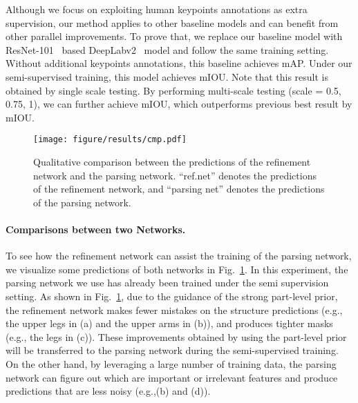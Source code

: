 \documentclass[10pt,twocolumn,letterpaper]{article}
\begin{document}
Although we focus on exploiting human keypoints annotations as extra supervision, our method applies to other baseline models and can benefit from other parallel improvements. To prove that, we replace our baseline model with ResNet-101~\cite{he2016deep} based DeepLabv2~\cite{chen2015deeplab} model and follow the same training setting. Without additional keypoints annotations, this baseline achieves  mAP. Under our semi-supervised training, this model achieves  mIOU. Note that this result is obtained by single scale testing. By performing multi-scale testing (scale = {0.5, 0.75, 1}), we can further achieve  mIOU, which outperforms previous best result by  mIOU.

\begin{figure}[t]
\begin{center}
\texttt{[image: figure/results/cmp.pdf]}
\end{center}
\vspace{-4mm}
   \caption{Qualitative comparison between the predictions of the refinement network and the parsing network. ``ref.net'' denotes the predictions of the refinement network, and ``parsing net'' denotes the predictions of the parsing network.}
\label{fig:cmp}
\vspace{-5mm}
\end{figure}
\vspace{-5mm}
\paragraph{Comparisons between two Networks.}
To see how the refinement network can assist the training of the parsing network, we visualize some predictions of both networks in Fig.~\ref{fig:cmp}. In this experiment, the parsing network we use has already been trained under the semi supervision setting. As shown in Fig.~\ref{fig:cmp}, due to the guidance of the strong part-level prior, the refinement network makes fewer mistakes on the structure predictions (e.g., the upper legs in (a) and the upper arms in (b)), and produces tighter masks (e.g., the legs in (c)). These improvements obtained by using the part-level prior will be transferred to the parsing network during the semi-supervised training. On the other hand, by leveraging a large number of training data, the parsing network can figure out which are important or irrelevant features and produce predictions that are less noisy (e.g.,(b) and (d)).
\end{document}
